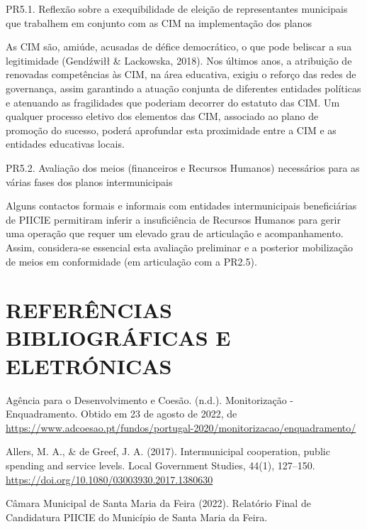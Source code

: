 \documentclass[
]{book}
\begin{document}
\leavevmode{}%
PR5.1. Reflexão sobre a exequibilidade de eleição de representantes municipais que trabalhem em conjunto com as CIM na implementação dos planos

As CIM são, amiúde, acusadas de défice democrático, o que pode beliscar a sua legitimidade (Gendźwiłł \& Lackowska, 2018). Nos últimos anos, a atribuição de renovadas competências às CIM, na área educativa, exigiu o reforço das redes de governança, assim garantindo a atuação conjunta de diferentes entidades políticas e atenuando as fragilidades que poderiam decorrer do estatuto das CIM. Um qualquer processo eletivo dos elementos das CIM, associado ao plano de promoção do sucesso, poderá aprofundar esta proximidade entre a CIM e as entidades educativas locais.

\leavevmode{}%
PR5.2. Avaliação dos meios (financeiros e Recursos Humanos) necessários para as várias fases dos planos intermunicipais

Alguns contactos formais e informais com entidades intermunicipais beneficiárias de PIICIE permitiram inferir a insuficiência de Recursos Humanos para gerir uma operação que requer um elevado grau de articulação e acompanhamento. Assim, considera-se essencial esta avaliação preliminar e a posterior mobilização de meios em conformidade (em articulação com a PR2.5).

\hypertarget{referuxeancias-bibliogruxe1ficas-e-eletruxf3nicas}{%
\chapter*{\texorpdfstring{\textbf{REFERÊNCIAS BIBLIOGRÁFICAS E ELETRÓNICAS}}{REFERÊNCIAS BIBLIOGRÁFICAS E ELETRÓNICAS}}\label{referuxeancias-bibliogruxe1ficas-e-eletruxf3nicas}}

Agência para o Desenvolvimento e Coesão. (n.d.). Monitorização - Enquadramento. Obtido em 23 de agosto de 2022, de \url{https://www.adcoesao.pt/fundos/portugal-2020/monitorizacao/enquadramento/}

Allers, M. A., \& de Greef, J. A. (2017). Intermunicipal cooperation, public spending and service levels. Local Government Studies, 44(1), 127--150. \url{https://doi.org/10.1080/03003930.2017.1380630}

Câmara Municipal de Santa Maria da Feira (2022). Relatório Final de Candidatura PIICIE do Município de Santa Maria da Feira.
\end{document}
